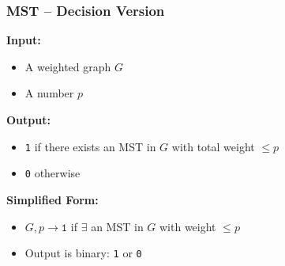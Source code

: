 \documentclass[10pt,aspectratio=43]{beamer}
\begin{document}
\begin{frame}
  \frametitle{MST – Decision Version}
  
  \textbf{Input:}
  \begin{itemize}
      \item A weighted graph $G$
      \vspace{3pt}
      \item A number $p$
  \end{itemize}
  
  \vspace{0.3cm}
  
  \textbf{Output:}
  \begin{itemize}
      \item \texttt{1} if there exists an MST in $G$ with total weight $\leq p$
      \vspace{3pt}
      \item \texttt{0} otherwise
  \end{itemize}
  
  \vspace{0.5cm}
  
  \textbf{Simplified Form:}
  \begin{itemize}
      \item $G, p \rightarrow \texttt{1}$ \quad if $\exists$ an MST in $G$ with weight $\leq p$
      \vspace{3pt}
      \item Output is binary: \texttt{1} or \texttt{0}
  \end{itemize}
  
  \vspace{0.3cm}
    \end{frame}
    
\end{document}

